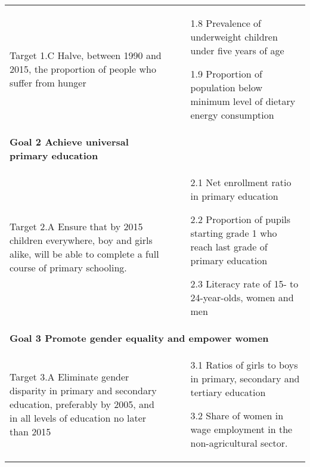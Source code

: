 \documentclass{article}
\begin{document}
\begin{center}
\begin{tabularx}{\textwidth}[t]{XX}
\hline

Target 1.C Halve, between 1990 and 2015, the proportion of people who suffer from hunger &
\begin{minipage}[t]{\linewidth}%
\begin{itemize}
\item[1.8] Prevalence of underweight children under five years of age
\item[1.9] Proportion of population below minimum level of dietary energy consumption
\end{itemize}
\end{minipage}\\

\arrayrulecolor{green}\hline
\textbf{\textcolor{myGreen}{Goal 2 Achieve universal primary education}} \\
\hline

Target 2.A Ensure that by 2015 children everywhere, boy and girls alike, will be able to complete a full course of primary schooling. &
\begin{minipage}[t]{\linewidth}%
\begin{itemize}
\item[2.1] Net enrollment ratio in primary education
\item[2.2] Proportion of pupils starting grade 1 who reach last grade of primary education
\item[2.3] Literacy rate of 15- to 24-year-olds, women and men
\end{itemize}
\end{minipage}\\

\hline
\multicolumn{2}{l}{%
\textbf{\textcolor{myGreen}{Goal 3 Promote gender equality and empower women}}} \\
\hline

Target 3.A Eliminate gender disparity in primary and secondary education, preferably by 2005, and in all levels of education no later than 2015 &
\begin{minipage}[t]{\linewidth}%
\begin{itemize}
\item[3.1] Ratios of girls to boys in primary, secondary and tertiary education
\item[3.2] Share of women in wage employment in the non-agricultural sector.
\end{itemize}
\end{minipage}
\end{tabularx}
\end{center}
\end{document}
